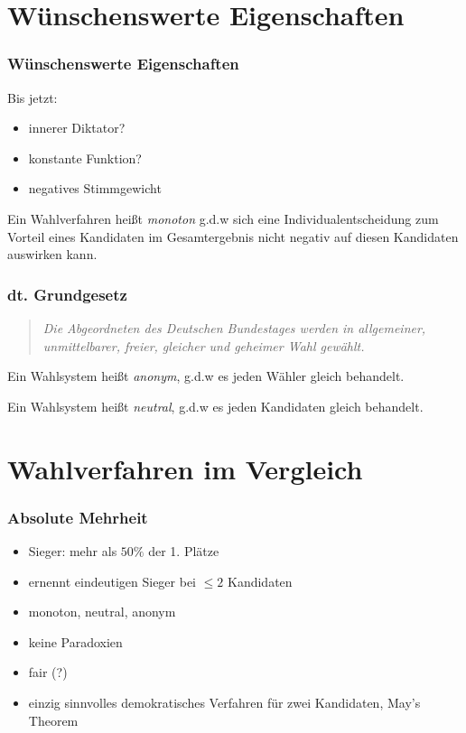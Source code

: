 \documentclass{beamer}
\begin{document}
\section{Wünschenswerte Eigenschaften}
\begin{frame}[fragile]
	\frametitle{Wünschenswerte Eigenschaften}
	Bis jetzt:
	\pause
	\begin{itemize}
		\item innerer Diktator?
		\pause
		\item konstante Funktion?
		\pause
		\item negatives Stimmgewicht
		\pause
	\end{itemize}
	\begin{definition}
	Ein Wahlverfahren heißt \emph{monoton} g.d.w sich eine Individualentscheidung zum Vorteil eines Kandidaten im Gesamtergebnis nicht negativ auf diesen Kandidaten auswirken kann.
	\end{definition}
\end{frame}


\begin{frame}[fragile]
	\frametitle{dt. Grundgesetz}
	\begin{quote}
	\textit{Die Abgeordneten des Deutschen Bundestages werden in allgemeiner, unmittelbarer, freier, gleicher und geheimer Wahl gewählt.} \cite{ggwahlrecht}
	\end{quote}
	\pause
	\begin{definition}
	Ein Wahlsystem heißt \emph{anonym}, g.d.w es jeden Wähler gleich behandelt.
	\end{definition}
	\begin{definition}
	Ein Wahlsystem heißt \emph{neutral}, g.d.w es jeden Kandidaten gleich behandelt.
	\end{definition}
\end{frame}


\section{Wahlverfahren im Vergleich}
\begin{frame}[fragile]
	\frametitle{Absolute Mehrheit}
	\begin{itemize}
		\item Sieger: mehr als $50\%$ der 1. Plätze
		\pause
		\item ernennt eindeutigen Sieger bei $\leq 2$ Kandidaten
		\pause
		\item monoton, neutral, anonym
		\pause
		\item keine Paradoxien
		\pause
		\item fair (?)
		\pause
		\item einzig sinnvolles demokratisches Verfahren für zwei Kandidaten, May's Theorem \cite{hodge2005mathematics}
	\end{itemize}
\end{frame}
\end{document}

